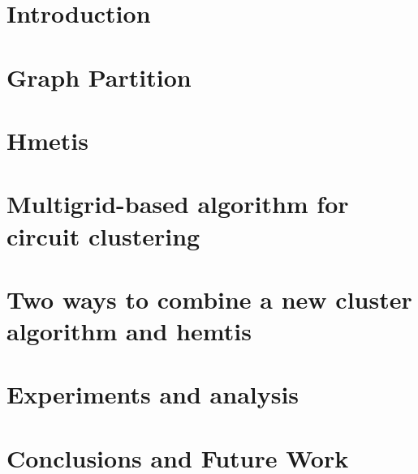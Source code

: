\documentclass[12pt,oneside]{book}
\theoremstyle{plain}
\theoremstyle{definition}
\newcommand{\newchapter}[2] { \newpage \chapter{#1} \label{chap:#2}  }
\begin{document}
\newpage



\newpage

\tableofcontents
\listoffigures
\listoftables

\mainmatter

\fontsize{11}{20pt} \selectfont  

\newchapter{Introduction}{introduction}
\newchapter{Graph Partition}{chapter1}
\newchapter{Hmetis}{chapter2}
\newchapter{Multigrid-based algorithm for circuit clustering}{chapter3}
\newchapter{Two ways to combine a new cluster algorithm and hemtis}{chapter4}
\newchapter{Experiments and analysis}{chapter5}
\newchapter{Conclusions and Future Work}{chapter6}




\fontsize{11}{11pt} \selectfont



\end{document}
